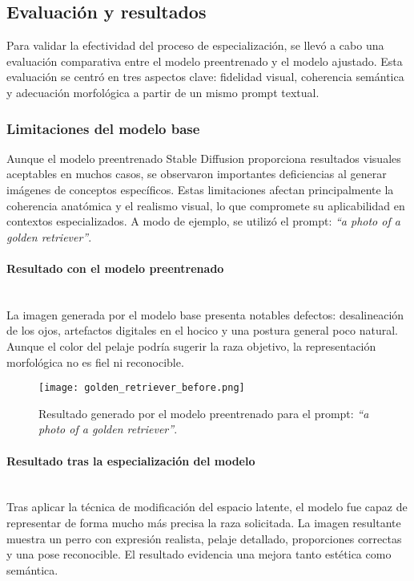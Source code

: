 \subsection{Evaluación y resultados}

Para validar la efectividad del proceso de especialización, se llevó a cabo una evaluación comparativa entre el modelo preentrenado y el modelo ajustado. Esta evaluación se centró en tres aspectos clave: fidelidad visual, coherencia semántica y adecuación morfológica a partir de un mismo prompt textual.

\subsubsection{Limitaciones del modelo base}

Aunque el modelo preentrenado Stable Diffusion proporciona resultados visuales aceptables en muchos casos, se observaron importantes deficiencias al generar imágenes de conceptos específicos. Estas limitaciones afectan principalmente la coherencia anatómica y el realismo visual, lo que compromete su aplicabilidad en contextos especializados. A modo de ejemplo, se utilizó el prompt: \textit{``a photo of a golden retriever''}.

\paragraph{\textbf{Resultado con el modelo preentrenado}} \mbox{}\\[0.5em]
La imagen generada por el modelo base presenta notables defectos: desalineación de los ojos, artefactos digitales en el hocico y una postura general poco natural. Aunque el color del pelaje podría sugerir la raza objetivo, la representación morfológica no es fiel ni reconocible.

\begin{figure}[H]
    \centering
    \texttt{[image: golden\_retriever\_before.png]}
    \caption{Resultado generado por el modelo preentrenado para el prompt: \textit{``a photo of a golden retriever''}.}
    \label{fig:golden-before}
\end{figure}

\paragraph{\textbf{Resultado tras la especialización del modelo}} \mbox{}\\[0.5em]
Tras aplicar la técnica de modificación del espacio latente, el modelo fue capaz de representar de forma mucho más precisa la raza solicitada. La imagen resultante muestra un perro con expresión realista, pelaje detallado, proporciones correctas y una pose reconocible. El resultado evidencia una mejora tanto estética como semántica.

